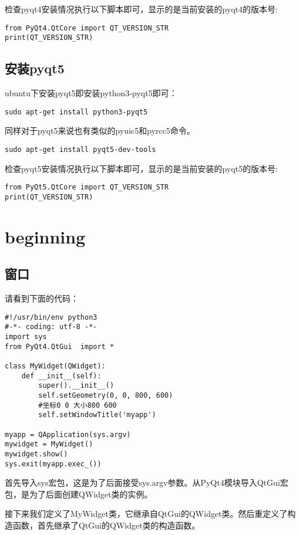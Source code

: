 \documentclass[11pt,oneside]{article}
\begin{document}
检查pyqt4安装情况执行以下脚本即可，显示的是当前安装的pyqt4的版本号:
\begin{verbatim}
from PyQt4.QtCore import QT_VERSION_STR
print(QT_VERSION_STR)
\end{verbatim}


\subsection{安装pyqt5}
\label{sec:orgheadline3}
ubuntu下安装pyqt5即安装python3-pyqt5即可：
\begin{verbatim}
sudo apt-get install python3-pyqt5
\end{verbatim}


同样对于pyqt5来说也有类似的pyuic5和pyrcc5命令。
\begin{verbatim}
sudo apt-get install pyqt5-dev-tools
\end{verbatim}

检查pyqt5安装情况执行以下脚本即可，显示的是当前安装的pyqt5的版本号:
\begin{verbatim}
from PyQt5.QtCore import QT_VERSION_STR
print(QT_VERSION_STR)
\end{verbatim}



\section{beginning}
\label{sec:orgheadline17}
\subsection{窗口}
\label{sec:orgheadline5}
请看到下面的代码：
\begin{verbatim}
#!/usr/bin/env python3
#-*- coding: utf-8 -*-
import sys
from PyQt4.QtGui  import *

class MyWidget(QWidget):
    def __init__(self):
        super().__init__()
        self.setGeometry(0, 0, 800, 600)
        #坐标0 0 大小800 600
        self.setWindowTitle('myapp')

myapp = QApplication(sys.argv)
mywidget = MyWidget()
mywidget.show()
sys.exit(myapp.exec_())
\end{verbatim}

首先导入sys宏包，这是为了后面接受sys.argv参数。从PyQt4模块导入QtGui宏包，是为了后面创建QWidget类的实例。

接下来我们定义了MyWidget类，它继承自QtGui的QWidget类。然后重定义了构造函数，首先继承了QtGui的QWidget类的构造函数。
\end{document}
